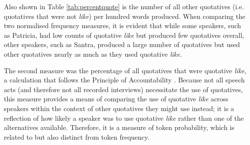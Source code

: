 \begin{table}[htbp]
\begin{center}
\begin{tabular}{llrrr}
\hline
		\end{tabular}
	
	\end{center}
\end{table} 

Also shown in Table \ref{tab:percentquote} is the number of all other quotatives (i.e. quotatives that were not \textit{like}) per hundred words produced.  When comparing the two normalised frequency measures, it is evident that while some speakers, such as Patricia, had low counts of quotative \textit{like} but produced few quotatives overall, other speakers, such as Santra, produced a large number of quotatives but used other quotatives nearly as much as they used quotative \textit{like}.  

The second measure was the percentage of all quotatives that were quotative \textit{like}, a calculation that follows the Principle of Accountability \cite{labov1972sociolingpatterns}.  Because not all speech acts (and therefore not all recorded interviews) necessitate the use of quotatives, this measure provides a means of comparing the use of quotative \textit{like} across speakers within the context of other quotatives they might use instead; it is a reflection of how likely a speaker was to use quotative \textit{like} rather than one of the alternatives available.  Therefore, it is a measure of token probability, which is related to but also distinct from token frequency.

